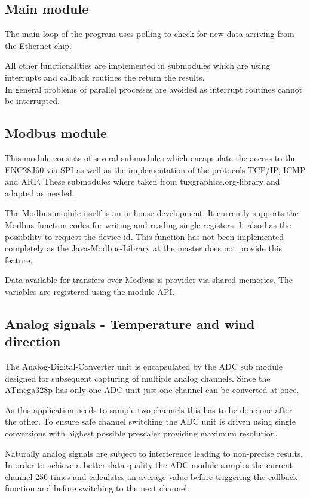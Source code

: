 \subsection{Main module}
The main loop of the program uses polling to check for new data arriving from the Ethernet chip.

All other functionalities are implemented in submodules which are using interrupts and callback routines the return the results.\\
In general problems of parallel processes are avoided as interrupt routines cannot be interrupted.


\subsection{Modbus module}
This module consists of several submodules which encapsulate the access to the ENC28J60 via SPI as well as the implementation of the protocols TCP/IP, ICMP and ARP.
These submodules where taken from tuxgraphics.org-library and adapted as needed.

The Modbus module itself is an in-house development. It currently supports the Modbus function codes for writing and reading single registers. It also has the possibility to request the device id. This function has not been implemented completely as the Java-Modbus-Library at the master does not provide this feature.

Data available for transfers over Modbus is provider via shared memories. The variables are registered using the module API.

\subsection{Analog signals - Temperature and wind direction}
The Analog-Digital-Converter unit is encapsulated by the ADC sub module designed for subsequent capturing of multiple analog channels.
Since the ATmega328p has only one ADC unit just one channel can be converted at once.

As this application needs to sample two channels this has to be done one after the other. To ensure safe channel switching the ADC unit is driven using single conversions with highest possible prescaler providing maximum resolution.

Naturally analog signals are subject to interference leading to non-precise results. In order to achieve a better data quality the ADC module samples the current channel 256 times and calculates an average value before triggering the callback function and before switching to the next channel.

